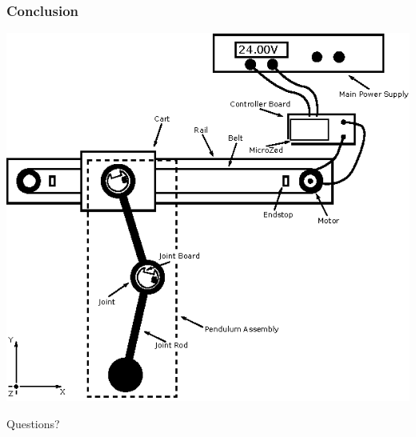 \documentclass[mathserif]{beamer}
\begin{document}
\begin{frame}[t]\frametitle{Conclusion}
	\centering
	\includegraphics[scale=1.1]{graphics/system_overview}
\end{frame}

\begin{frame}[standout]
  Questions?
\end{frame}
\end{document}
